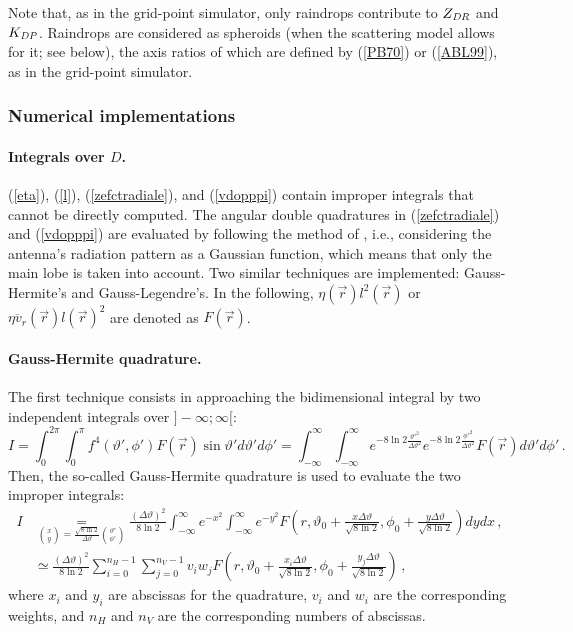 Note that, as in the grid-point simulator, only raindrops contribute to $Z_{\it DR}$ and $K_{\it DP}$. Raindrops are considered as spheroids (when the scattering model allows for it; see below), the axis ratios of which are defined by (\ref{PB70}) or (\ref{ABL99}), as in the grid-point simulator.

\subsubsection{Numerical implementations}
\paragraph{Integrals over $D$.}
(\ref{eta}), (\ref{l}), (\ref{zefctradiale}), and (\ref{vdopppi}) contain improper integrals that cannot be directly computed. The angular double quadratures in (\ref{zefctradiale}) and (\ref{vdopppi}) are evaluated by following the method of \cite{Probert-Jones1962}, i.e., considering the antenna's radiation pattern as a Gaussian function, which means that only the main lobe is taken into account. Two similar techniques are implemented: Gauss-Hermite's and Gauss-Legendre's. In the following, $\eta(\vec r)l^2(\vec{r})$ or $\overline{\eta v_r}(\vec r)l(\vec r)^2$ are denoted as $F(\vec r)$.

\paragraph{Gauss-Hermite quadrature.} The first technique consists in approaching the bidimensional integral by two independent integrals over $]-\infty;\infty[$:
\begin{equation}
I=\int_0^{2\pi}\!\!\!\int_0^\pi f^4(\vartheta',\phi')F(\vec r)\sin\vartheta'd\vartheta'd\phi'=\int_{-\infty}^\infty\!\int_{-\infty}^\infty e^{-8\ln2\frac{\vartheta'^2}{\Delta\vartheta^2}}e^{-8\ln2\frac{\phi'^2}{\Delta\vartheta^2}}F(\vec r)d\vartheta'd\phi'\,.
\end{equation}
Then, the so-called Gauss-Hermite quadrature is used to evaluate the two improper integrals:
\begin{align}
I&\underset{\binom xy=\frac{\sqrt{8\ln2}}{\Delta\vartheta}\binom{\vartheta'}{\phi'}}=\frac{(\Delta\vartheta)^2}{8\ln2}\int_{-\infty}^\infty e^{-x^2}\!\int_{-\infty}^\infty e^{-y^2}F\left(r,\vartheta_0+\frac{x\Delta\vartheta}{\sqrt{8\ln2}},\phi_0+\frac{y\Delta\vartheta}{\sqrt{8\ln2}}\right)d yd x\,,\\
&\simeq\frac{(\Delta\vartheta)^2}{8\ln2}\sum_{i=0}^{n_H-1}\sum_{j=0}^{n_V-1}v_iw_jF\left(r,\vartheta_0+\frac{x_i\Delta\vartheta}{\sqrt{8\ln2}},\phi_0+\frac{y_j\Delta\vartheta}{\sqrt{8\ln2}}\right)\,,
\end{align}
where $x_i$ and $y_i$ are abscissas for the quadrature, $v_i$ and $w_i$ are the corresponding weights, and $n_H$ and $n_V$ are the corresponding numbers of abscissas. 


